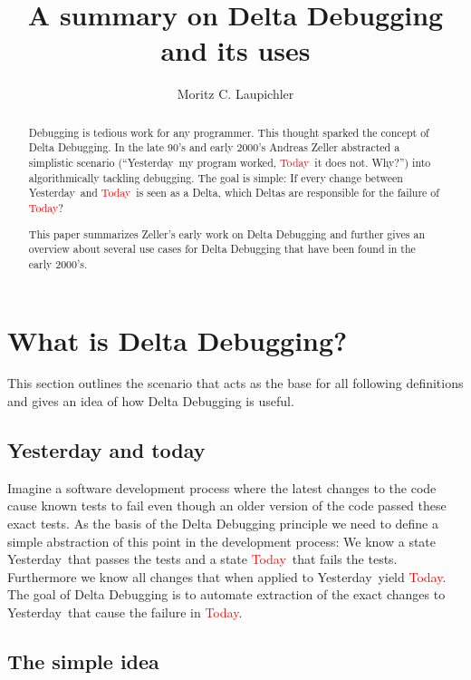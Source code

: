 \documentclass[a4paper,UKenglish]{lipics-v2018}
\title{A summary on Delta Debugging and its uses}
\author{Moritz C. Laupichler}{Fakultät für Informatik, Karlsruhe Institute of Technology, Germany}{moritz.laupichler@student.kit.edu}{}{}
\newcommand{\green}[1]{\textcolor{td-green}{#1}}
\newcommand{\red}[1]{\textcolor{red}{#1}}
\newcommand{\yd}[0]{\green{Yesterday}}
\newcommand{\td}[0]{\red{Today}}
\begin{document}
\maketitle

\begin{abstract}
	Debugging is tedious work for any programmer. This thought sparked the concept of Delta Debugging. In the late 90's and early 2000's Andreas Zeller abstracted a simplistic scenario (``\yd\ my program worked, \td\ it does not. Why?'') into algorithmically tackling debugging. The goal is simple: If every change between \yd\ and \td\ is seen as a Delta, which Deltas are responsible for the failure of \td?

	This paper summarizes Zeller's early work on Delta Debugging \cite{Zeller:1999:YMP:318774.318946} and further gives an overview about several use cases for Delta Debugging that have been found in the early 2000's. 
\end{abstract}
	
\section{What is Delta Debugging?}
\label{sec:what_is_dd}

This section outlines the scenario that acts as the base for all following definitions and gives an idea of how Delta Debugging is useful.

\subsection{Yesterday and today}
\label{ydandtd}

Imagine a software development process where the latest changes to the code cause known tests to fail even though an older version of the code passed these exact tests. As the basis of the Delta Debugging principle we need to define a simple abstraction of this point in the development process: We know a state \yd\ that passes the tests and a state \td\ that fails the tests. Furthermore we know all changes that when applied to \yd\ yield \td. \\
The goal of Delta Debugging is to automate extraction of the exact changes to \yd\ that cause the failure in \td.  

\subsection{The simple idea}
\label{ddidea}
\end{document}
